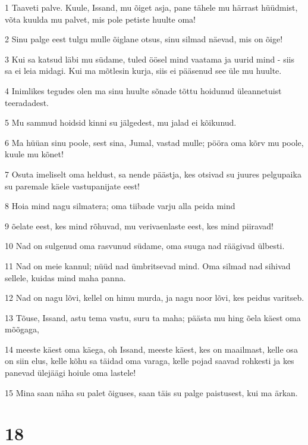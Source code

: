 \par 1 Taaveti palve. Kuule, Issand, mu õiget asja, pane tähele mu härrast hüüdmist, võta kuulda mu palvet, mis pole petiste huulte oma!
\par 2 Sinu palge eest tulgu mulle õiglane otsus, sinu silmad näevad, mis on õige!
\par 3 Kui sa katsud läbi mu südame, tuled öösel mind vaatama ja uurid mind - siis sa ei leia midagi. Kui ma mõtlesin kurja, siis ei pääsenud see üle mu huulte.
\par 4 Inimlikes tegudes olen ma sinu huulte sõnade tõttu hoidunud üleannetuist teeradadest.
\par 5 Mu sammud hoidsid kinni su jälgedest, mu jalad ei kõikunud.
\par 6 Ma hüüan sinu poole, sest sina, Jumal, vastad mulle; pööra oma kõrv mu poole, kuule mu kõnet!
\par 7 Osuta imeliselt oma heldust, sa nende päästja, kes otsivad su juures pelgupaika su paremale käele vastupanijate eest!
\par 8 Hoia mind nagu silmatera; oma tiibade varju alla peida mind
\par 9 õelate eest, kes mind rõhuvad, mu verivaenlaste eest, kes mind piiravad!
\par 10 Nad on sulgenud oma rasvunud südame, oma suuga nad räägivad ülbesti.
\par 11 Nad on meie kannul; nüüd nad ümbritsevad mind. Oma silmad nad sihivad sellele, kuidas mind maha panna.
\par 12 Nad on nagu lõvi, kellel on himu murda, ja nagu noor lõvi, kes peidus varitseb.
\par 13 Tõuse, Issand, astu tema vastu, suru ta maha; päästa mu hing õela käest oma mõõgaga,
\par 14 meeste käest oma käega, oh Issand, meeste käest, kes on maailmast, kelle osa on siin elus, kelle kõhu sa täidad oma varaga, kelle pojad saavad rohkesti ja kes panevad ülejäägi hoiule oma lastele!
\par 15 Mina saan näha su palet õiguses, saan täis su palge paistusest, kui ma ärkan.

\chapter{18}

